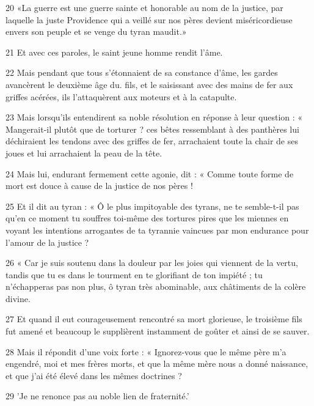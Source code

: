 \par 20 «La guerre est une guerre sainte et honorable au nom de la justice, par laquelle la juste Providence qui a veillé sur nos pères devient miséricordieuse envers son peuple et se venge du tyran maudit.»

\par 21 Et avec ces paroles, le saint jeune homme rendit l'âme.

\par 22 Mais pendant que tous s'étonnaient de sa constance d'âme, les gardes avancèrent le deuxième âge du. fils, et le saisissant avec des mains de fer aux griffes acérées, ils l'attaquèrent aux moteurs et à la catapulte.

\par 23 Mais lorsqu'ils entendirent sa noble résolution en réponse à leur question : « Mangerait-il plutôt que de torturer ? ces bêtes ressemblant à des panthères lui déchiraient les tendons avec des griffes de fer, arrachaient toute la chair de ses joues et lui arrachaient la peau de la tête.

\par 24 Mais lui, endurant fermement cette agonie, dit : « Comme toute forme de mort est douce à cause de la justice de nos pères !

\par 25 Et il dit au tyran : « Ô le plus impitoyable des tyrans, ne te semble-t-il pas qu'en ce moment tu souffres toi-même des tortures pires que les miennes en voyant les intentions arrogantes de ta tyrannie vaincues par mon endurance pour l'amour de la justice ?

\par 26 « Car je suis soutenu dans la douleur par les joies qui viennent de la vertu, tandis que tu es dans le tourment en te glorifiant de ton impiété ; tu n'échapperas pas non plus, ô tyran très abominable, aux châtiments de la colère divine.

\par 27 Et quand il eut courageusement rencontré sa mort glorieuse, le troisième fils fut amené et beaucoup le supplièrent instamment de goûter et ainsi de se sauver.

\par 28 Mais il répondit d'une voix forte : « Ignorez-vous que le même père m'a engendré, moi et mes frères morts, et que la même mère nous a donné naissance, et que j'ai été élevé dans les mêmes doctrines ?

\par 29 'Je ne renonce pas au noble lien de fraternité.'

